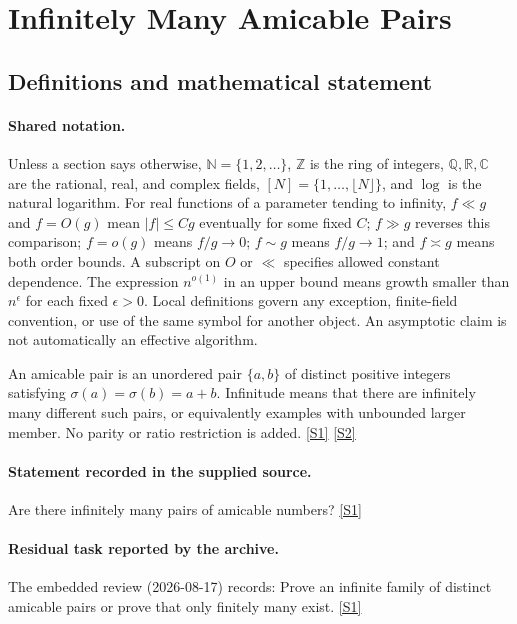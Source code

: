 \documentclass[11pt,a4paper]{article}
\newcommand{\N}{\mathbb{N}}
\newcommand{\Z}{\mathbb{Z}}
\newcommand{\Q}{\mathbb{Q}}
\newcommand{\R}{\mathbb{R}}
\newcommand{\C}{\mathbb{C}}
\newcommand{\sref}[2]{\hyperlink{source:#1:#2}{[S#2]}}
\begin{document}
\section{Infinitely Many Amicable Pairs}\label{statement}


\subsection{Definitions and mathematical statement}

\paragraph{Shared notation.}Unless a section says otherwise, $\N=\{1,2,\ldots\}$,
$\Z$ is the ring of integers, $\Q,\R,\C$ are the rational, real, and complex
fields, $[N]=\{1,\ldots,\lfloor N\rfloor\}$, and $\log$ is the natural
logarithm. For real functions of a parameter tending to infinity,
$f\ll g$ and $f=O(g)$ mean $|f|\leq Cg$ eventually for some fixed $C$;
$f\gg g$ reverses this comparison; $f=o(g)$ means $f/g\to0$;
$f\sim g$ means $f/g\to1$; and $f\asymp g$ means both order bounds.
A subscript on $O$ or $\ll$ specifies allowed constant dependence.
The expression $n^{o(1)}$ in an upper bound means growth smaller than
$n^\epsilon$ for each fixed $\epsilon>0$. Local definitions govern any
exception, finite-field convention, or use of the same symbol for another
object. An asymptotic claim is not automatically an effective algorithm.



An amicable pair is an unordered pair $\{a,b\}$ of distinct positive integers satisfying $\sigma(a)=\sigma(b)=a+b$. Infinitude means that there are infinitely many different such pairs, or equivalently examples with unbounded larger member. No parity or ratio restriction is added. \sref{statement}{1} \sref{statement}{2}

\paragraph{Statement recorded in the supplied source.}
Are there infinitely many pairs of amicable numbers? \sref{statement}{1}

\paragraph{Residual task reported by the archive.}

The embedded review (2026-08-17) records: Prove an infinite family of distinct amicable pairs or prove that only finitely many exist. \sref{statement}{1}
\end{document}
